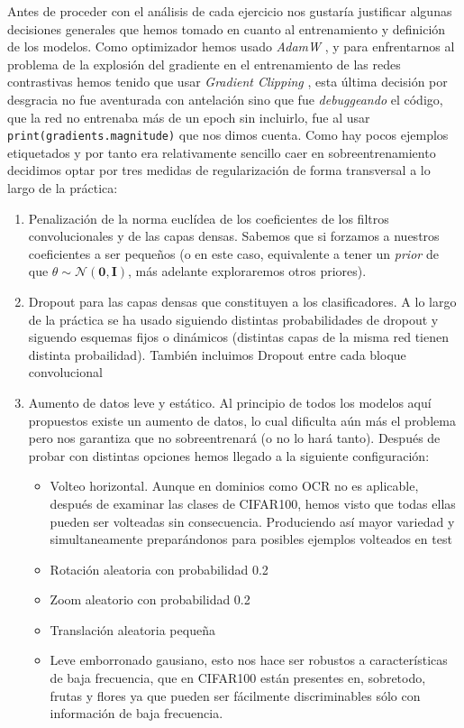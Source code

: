 \documentclass{article}
\begin{document}
Antes de proceder con el análisis de cada ejercicio nos gustaría justificar algunas decisiones generales que hemos tomado en cuanto al entrenamiento y definición de los modelos. Como optimizador hemos usado \emph{AdamW} \cite{loshchilov2017decoupled}, y para enfrentarnos al problema de la explosión del gradiente en el entrenamiento de las redes contrastivas hemos tenido que usar \emph{Gradient Clipping} \cite{mikolov2012phd}, esta última decisión por desgracia no fue aventurada con antelación sino que fue \emph{debuggeando} el código, que la red no entrenaba más de un epoch sin incluirlo, fue al usar \texttt{print(gradients.magnitude)} que nos dimos cuenta. Como hay pocos ejemplos etiquetados y por tanto era relativamente sencillo caer en sobreentrenamiento decidimos optar por tres medidas de regularización de forma transversal a lo largo de la práctica:

\begin{enumerate}
    \item Penalización de la norma euclídea de los coeficientes de los filtros convolucionales y de las capas densas. Sabemos que si forzamos a nuestros coeficientes a ser pequeños (o en este caso, equivalente a tener un \emph{prior} de que $ \theta\sim \mathcal{N} \left( \mathbf{0}, \mathbf{I} \right)$, más adelante exploraremos otros priores).
    \item Dropout \cite{srivastava2014dropout} para las capas densas que constituyen a los clasificadores. A lo largo de la práctica se ha usado siguiendo distintas probabilidades de dropout y siguendo esquemas fijos o dinámicos (distintas capas de la misma red tienen distinta probailidad). También incluimos Dropout entre cada bloque convolucional
    \item Aumento de datos leve y estático. Al principio de todos los modelos aquí propuestos existe un aumento de datos, lo cual dificulta aún más el problema pero nos garantiza que no sobreentrenará (o no lo hará tanto). Después de probar con distintas opciones hemos llegado a la siguiente configuración:
        \begin{itemize}
            \item Volteo horizontal. Aunque en dominios como OCR no es aplicable, después de examinar las clases de CIFAR100, hemos visto que todas ellas pueden ser volteadas sin consecuencia. Produciendo así mayor variedad y simultaneamente preparándonos para posibles ejemplos volteados en test
            \item Rotación aleatoria con probabilidad 0.2
            \item Zoom aleatorio con probabilidad 0.2
            \item Translación aleatoria pequeña
            \item Leve emborronado gausiano, esto nos hace ser robustos a características de baja frecuencia, que en CIFAR100 están presentes en, sobretodo, frutas y flores ya que pueden ser fácilmente discriminables sólo con información de baja frecuencia. 
        \end{itemize}
\end{enumerate}
\end{document}
